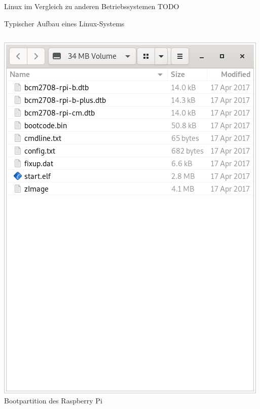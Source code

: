 \begin{frame}{Linux im Vergleich zu anderen Betriebssystemen}
    TODO
\end{frame}

{
\footnotesize

\begin{frame}[allowframebreaks]{Typischer Aufbau eines Linux-Systems}
    \begin{columns}
        \begin{center}
            \includegraphics[width=\textwidth]{8-linux/img/partition-boot}
            \smallskip
            Bootpartition des Raspberry Pi
        \end{center}


\end{columns}
\end{frame}}
